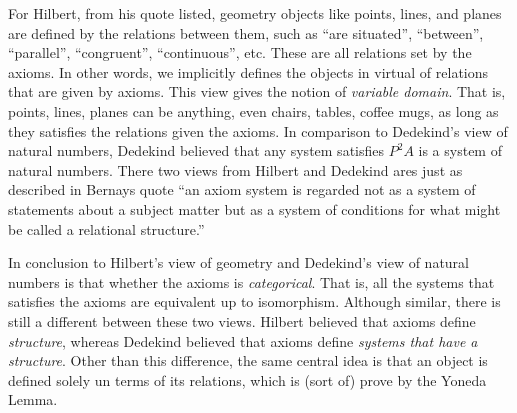 \documentclass[11pt]{article}
\begin{document}
For Hilbert, from his quote listed, geometry objects
like points, lines, and planes are defined by the relations between them,
such as ``are situated'', ``between'', ``parallel'', ``congruent'', ``continuous'', etc.
These are all relations set by the axioms.
In other words, we implicitly defines the objects in virtual of relations that are given by axioms.
This view gives the notion of \textit{variable domain}.
That is, points, lines, planes can be anything,
even chairs, tables, coffee mugs,
as long as they satisfies the relations given the axioms.
In comparison to Dedekind's view of natural numbers,
Dedekind believed that any system satisfies $P^2A$ is a system of natural numbers.
There two views from Hilbert and Dedekind ares just as described in Bernays quote
``an axiom system is regarded not as a system of statements about a subject matter 
but as a system of conditions for what might be called a relational structure.''

In conclusion to Hilbert's view of geometry and Dedekind's view of natural numbers
is that whether the axioms is \textit{categorical}.
That is, all the systems that satisfies the axioms are equivalent up to isomorphism.
Although similar, there is still a different between these two views.
Hilbert believed that axioms define \textit{structure},
whereas Dedekind believed that axioms define \textit{systems that have a structure}.
Other than this difference,
the same central idea is that an object is defined solely un terms of its relations,
which is (sort of) prove by the Yoneda Lemma.
\end{document}

